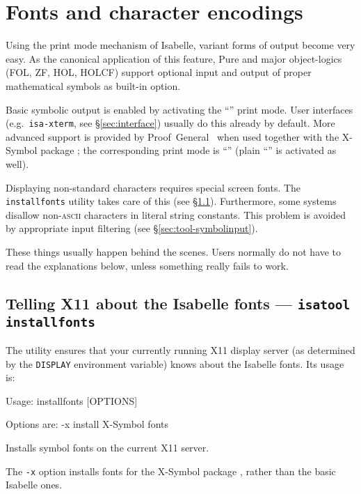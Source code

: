 

\chapter{Fonts and character encodings}

Using the print mode mechanism of Isabelle, variant forms of output become
very easy. As the canonical application of this feature, Pure and major
object-logics (FOL, ZF, HOL, HOLCF) support optional input and output of
proper mathematical symbols as built-in option.

Basic symbolic output is enabled by activating the ``'' print
mode.  User interfaces (e.g.\ \texttt{isa-xterm}, see \S\ref{sec:interface})
usually do this already by default.  More advanced support is provided by
Proof~General~\cite{proofgeneral} when used together with the X-Symbol package
\cite{x-symbol}; the corresponding print mode is ``'' (plain
``'' is activated as well).

\medskip Displaying non-standard characters requires special screen fonts. The
\texttt{installfonts} utility takes care of this (see
\S\ref{sec:tool-installfonts}). Furthermore, some {\ML} systems disallow
non-\textsc{ascii} characters in literal string constants.  This problem is
avoided by appropriate input filtering (see \S\ref{sec:tool-symbolinput}).

These things usually happen behind the scenes.  Users normally do not have to
read the explanations below, unless something really fails to work.


\section{Telling X11 about the Isabelle fonts --- \texttt{isatool installfonts}}
\label{sec:tool-installfonts}

The  utility ensures that your currently running X11
display server (as determined by the \texttt{DISPLAY} environment variable)
knows about the Isabelle fonts. Its usage is:
\begin{ttbox}
Usage: installfonts [OPTIONS]

  Options are:
    -x           install X-Symbol fonts

  Installs symbol fonts on the current X11 server.
\end{ttbox}

The \texttt{-x} option installs fonts for the X-Symbol package
\cite{x-symbol}, rather than the basic Isabelle ones.

